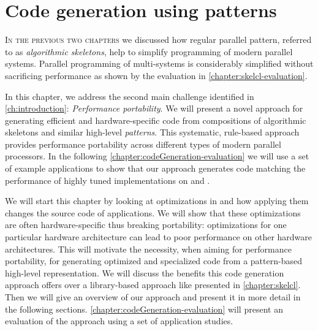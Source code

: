 
\chapter{Code generation using patterns}
%
%
%

\label{ch:fifth} %
\label{chapter:codeGeneration}

\lettrine[lines=3, loversize=0.1]{I}{n the previous two chapters} we discussed how regular parallel pattern, referred to as \emph{algorithmic skeletons}, help to simplify programming of modern parallel systems.
Parallel programming of multi-\GPU systems is considerably simplified without sacrificing performance as shown by the evaluation in \autoref{chapter:skelcl-evaluation}.

In this chapter, we address the second main challenge identified in \autoref{ch:introduction}: \emph{Performance portability}.
We will present a novel approach for generating efficient and hardware-specific code from compositions of algorithmic skeletons and similar high-level \emph{patterns}.
This systematic, rule-based approach provides performance portability across different types of modern parallel processors. 
In the following \autoref{chapter:codeGeneration-evaluation} we will use a set of example applications to show that our approach generates code matching the performance of highly tuned implementations on \CPUs and \GPUs.

We will start this chapter by looking at optimizations in \OpenCL and how applying them changes the source code of applications.
We will show that these optimizations are often hardware-specific thus breaking portability: optimizations for one particular hardware architecture can lead to poor performance on other hardware architectures.
This will motivate the necessity, when aiming for performance portability, for generating optimized and specialized code from a pattern-based high-level representation.
We will discuss the benefits this code generation approach offers over a library-based approach like \SkelCL presented in \autoref{chapter:skelcl}.
Then we will give an overview of our approach and present it in more detail in the following sections.
\autoref{chapter:codeGeneration-evaluation} will present an evaluation of the approach using a set of application studies.

